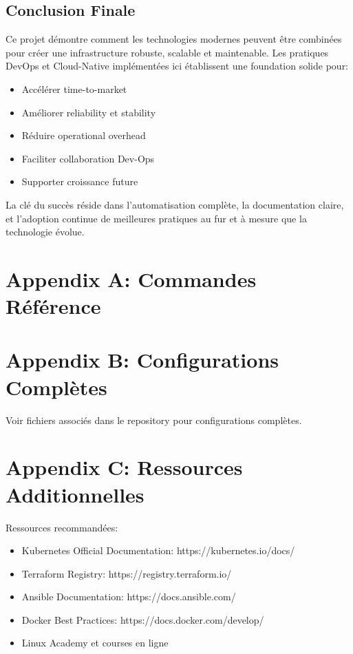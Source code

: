 \documentclass[12pt,a4paper]{report}
\begin{document}
\section{Conclusion Finale}

Ce projet démontre comment les technologies modernes peuvent être combinées pour créer une infrastructure robuste, scalable et maintenable. Les pratiques DevOps et Cloud-Native implémentées ici établissent une foundation solide pour:

\begin{itemize}
    \item Accélérer time-to-market
    \item Améliorer reliability et stability
    \item Réduire operational overhead
    \item Faciliter collaboration Dev-Ops
    \item Supporter croissance future
\end{itemize}

La clé du succès réside dans l'automatisation complète, la documentation claire, et l'adoption continue de meilleures pratiques au fur et à mesure que la technologie évolue.

\newpage

\chapter*{Appendix A: Commandes Référence}



\chapter*{Appendix B: Configurations Complètes}

Voir fichiers associés dans le repository pour configurations complètes.

\chapter*{Appendix C: Ressources Additionnelles}

Ressources recommandées:
\begin{itemize}
    \item Kubernetes Official Documentation: https://kubernetes.io/docs/
    \item Terraform Registry: https://registry.terraform.io/
    \item Ansible Documentation: https://docs.ansible.com/
    \item Docker Best Practices: https://docs.docker.com/develop/
    \item Linux Academy et courses en ligne
\end{itemize}
\end{document}
